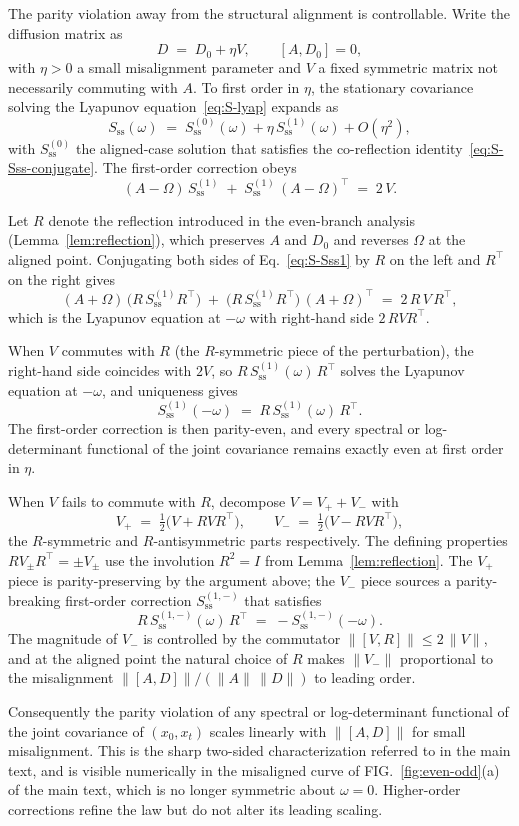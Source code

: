 \documentclass[%
 reprint,
 superscriptaddress,
 nofootinbib,
 nobibnotes,
 amsmath,amssymb,
 aps,
 prl,
 floatfix,
]{revtex4-2}
\newcommand{\Sss}{S_{\mathrm{ss}}}
\begin{document}
The parity violation away from the structural alignment is controllable. Write the diffusion matrix as
\begin{equation}\label{eq:S-perturb-setup}
D \;=\; D_0 + \eta V, \qquad [A, D_0] = 0,
\end{equation}
with $\eta > 0$ a small misalignment parameter and $V$ a fixed symmetric matrix not necessarily commuting with $A$. To first order in $\eta$, the stationary covariance solving the Lyapunov equation~\eqref{eq:S-lyap} expands as
\[
\Sss(\omega) \;=\; \Sss^{(0)}(\omega) + \eta\,\Sss^{(1)}(\omega) + O(\eta^2),
\]
with $\Sss^{(0)}$ the aligned-case solution that satisfies the co-reflection identity~\eqref{eq:S-Sss-conjugate}. The first-order correction obeys
\begin{equation}\label{eq:S-Sss1}
(A - \Omega)\,\Sss^{(1)} \;+\; \Sss^{(1)}\,(A - \Omega)^\top \;=\; 2\,V.
\end{equation}

Let $R$ denote the reflection introduced in the even-branch analysis (Lemma~\ref{lem:reflection}), which preserves $A$ and $D_0$ and reverses $\Omega$ at the aligned point. Conjugating both sides of Eq.~\eqref{eq:S-Sss1} by $R$ on the left and $R^\top$ on the right gives
\[
(A + \Omega)\,\bigl(R\,\Sss^{(1)} R^\top\bigr) \;+\; \bigl(R\,\Sss^{(1)} R^\top\bigr)\,(A + \Omega)^\top \;=\; 2\,R\,V\,R^\top,
\]
which is the Lyapunov equation at $-\omega$ with right-hand side $2\,R V R^\top$.

When $V$ commutes with $R$ (the $R$-symmetric piece of the perturbation), the right-hand side coincides with $2 V$, so $R\,\Sss^{(1)}(\omega)\,R^\top$ solves the Lyapunov equation at $-\omega$, and uniqueness gives
\[
\Sss^{(1)}(-\omega) \;=\; R\,\Sss^{(1)}(\omega)\,R^\top.
\]
The first-order correction is then parity-even, and every spectral or log-determinant functional of the joint covariance remains exactly even at first order in $\eta$.

When $V$ fails to commute with $R$, decompose $V = V_+ + V_-$ with
\[
V_+ \;=\; \tfrac{1}{2}\bigl(V + R V R^\top\bigr), \qquad V_- \;=\; \tfrac{1}{2}\bigl(V - R V R^\top\bigr),
\]
the $R$-symmetric and $R$-antisymmetric parts respectively. The defining properties $R V_\pm R^\top = \pm V_\pm$ use the involution $R^2 = I$ from Lemma~\ref{lem:reflection}. The $V_+$ piece is parity-preserving by the argument above; the $V_-$ piece sources a parity-breaking first-order correction $\Sss^{(1,-)}$ that satisfies
\[
R\,\Sss^{(1,-)}(\omega)\,R^\top \;=\; -\Sss^{(1,-)}(-\omega).
\]
The magnitude of $V_-$ is controlled by the commutator $\|[V, R]\| \le 2\,\|V\|$, and at the aligned point the natural choice of $R$ makes $\|V_-\|$ proportional to the misalignment $\|[A, D]\|/(\|A\|\,\|D\|)$ to leading order.

Consequently the parity violation of any spectral or log-determinant functional of the joint covariance of $(x_0, x_t)$ scales linearly with $\|[A, D]\|$ for small misalignment. This is the sharp two-sided characterization referred to in the main text, and is visible numerically in the misaligned curve of FIG.~\ref{fig:even-odd}(a) of the main text, which is no longer symmetric about $\omega = 0$. Higher-order corrections refine the law but do not alter its leading scaling.
\end{document}
